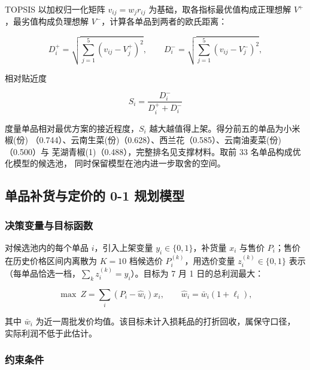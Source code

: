 TOPSIS 以加权归一化矩阵 $v_{ij}=w_j r_{ij}$ 为基础，取各指标最优值构成正理想解
$V^+$，最劣值构成负理想解 $V^-$，计算各单品到两者的欧氏距离：

\begin{equation}
D_i^+=\sqrt{\sum_{j=1}^{5}(v_{ij}-V_j^+)^2},\qquad
D_i^-=\sqrt{\sum_{j=1}^{5}(v_{ij}-V_j^-)^2},
\label{eq:topsis_d}
\end{equation}

相对贴近度

\begin{equation}
S_i=\frac{D_i^-}{D_i^++D_i^-}
\label{eq:topsis_s}
\end{equation}

度量单品相对最优方案的接近程度，$S_i$ 越大越值得上架。得分前五的单品为小米椒(份)
（0.744）、云南生菜(份)（0.628）、西兰花（0.585）、云南油麦菜(份)（0.500）与
芜湖青椒(1)（0.488），完整排名见支撑材料。取前 33 名单品构成优化模型的候选池，
同时保留模型在池内进一步取舍的空间。

\subsection{单品补货与定价的 0-1 规划模型}

\subsubsection{决策变量与目标函数}

对候选池内的每个单品 $i$，引入上架变量 $y_i\in\{0,1\}$，补货量 $x_i$ 与售价
$P_i$；售价在历史价格区间内离散为 $K=10$ 档候选价 $P_i^{(k)}$，用选价变量
$z_i^{(k)}\in\{0,1\}$ 表示（每单品恰选一档，$\sum_k z_i^{(k)}=y_i$）。目标为
7 月 1 日的总利润最大：

\begin{equation}
\max\ Z=\sum_{i}\left(P_i-\hat w_i\right)x_i,\qquad
\hat w_i=\bar w_i(1+\ell_i),
\label{eq:q3obj}
\end{equation}

其中 $\bar w_i$ 为近一周批发价均值。该目标未计入损耗品的打折回收，属保守口径，
实际利润不低于此估计。

\subsubsection{约束条件}

